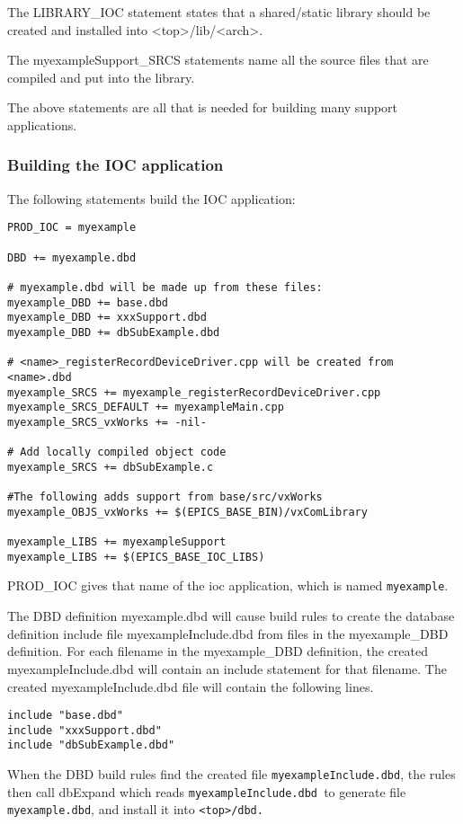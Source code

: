 The LIBRARY\_IOC statement states that a shared/static library should be created and installed into \textless{}top\textgreater{}/lib/\textless{}arch\textgreater{}.

The myexampleSupport\_SRCS statements name all the source files that are compiled and put into the library.

The above statements are all that is needed for building many support applications.

\subsubsection{Building the IOC application}

The following statements build the IOC application:

\begin{verbatim}PROD_IOC = myexample

DBD += myexample.dbd

# myexample.dbd will be made up from these files:
myexample_DBD += base.dbd
myexample_DBD += xxxSupport.dbd
myexample_DBD += dbSubExample.dbd

# <name>_registerRecordDeviceDriver.cpp will be created from <name>.dbd
myexample_SRCS += myexample_registerRecordDeviceDriver.cpp
myexample_SRCS_DEFAULT += myexampleMain.cpp
myexample_SRCS_vxWorks += -nil-

# Add locally compiled object code
myexample_SRCS += dbSubExample.c

#The following adds support from base/src/vxWorks
myexample_OBJS_vxWorks += $(EPICS_BASE_BIN)/vxComLibrary

myexample_LIBS += myexampleSupport
myexample_LIBS += $(EPICS_BASE_IOC_LIBS)
\end{verbatim}PROD\_IOC gives that name of the ioc application, which is named \verb|myexample|. 

The DBD definition myexample.dbd will cause build rules to create the database definition include file 
myexampleInclude.dbd from files in the myexample\_DBD definition. For each filename in the myexample\_DBD 
definition, the created myexampleInclude.dbd will contain an include statement for that filename. The created 
myexampleInclude.dbd file will contain the following lines.

\begin{verbatim}include "base.dbd"
include "xxxSupport.dbd"
include "dbSubExample.dbd"
\end{verbatim}When the DBD build rules find the created file \verb|myexampleInclude.dbd|, the rules then call dbExpand which reads 
\verb|myexampleInclude.dbd |to generate file \verb|myexample.dbd|, and install it into \verb|<top>/dbd.|

